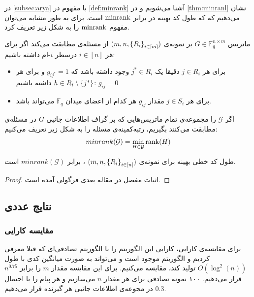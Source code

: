 در
\autoref{subsec:arya}
با مفهوم
در
\autoref{def:minrank}
آشنا می‌شویم و در
\autoref{thm:minranl}
نشان می‌دهیم که که طول کد بهینه در
\icod
برابر 
$\mathrm{minrank}$
است. برای
\picod
به طور مشابه می‌توان مفهوم
$\mathrm{minrank}$
را به شکل زیر تعریف کرد.
\begin{definition}
	ماتریس
	$G \in \mathbb{F}^{n\times m}_q$
	بر نمونه‌ی
		$(m, n, \left\{ R_i \right\}_{i \in [m]})$
		از مسئله‌ی
	\picod
	مطابقت می‌کند اگر برای هر
	$i \in [n]$
	درسطر 
	$i$-ام
	داشته باشیم:
	\begin{itemize}
		\item
		برای هر
		$j \in R_i$
		دقیقا یک
		$j^\ast \in R_i$
		وجود داشته باشد که 
		$g_{i j^\ast}= 1$
		و برای هر
		$h \in R_i \setminus \left\{ j^\ast \right\}$
		داشته باشیم:
		$g_{i j} = 0$ 
		\item
		برای هر
		$j \in S_i$
		مقدار
		$g_{i j}$
		هر کدام از اعضای میدان
		$\mathbb{F}_q$
		می‌تواند باشد.
	\end{itemize}
\end{definition}
\begin{definition}
	اگر
	$\mathcal{G}$
	را مجموعه‌ی تمام ماتریس‌هایی که بر گراف اطلاعات جانبی 	$G$ در مسئله‌ی
	\picod
	مطابقت می‌کنند بگیریم، رتبه‌کمینه‌ی مسئله را به شکل زیر تعریف می‌کنیم:
	$$minrank(\mathcal{G}) = \min_{H \in \mathcal{G}} \operatorname{rank}(H)$$
	
\end{definition}
\begin{theorem}
	\label{theorem:pliable2016:theorem3}
	طول کد خطی بهینه برای نمونه‌ی
	$(m, n, \left\{ R_i \right\}_{i \in [n]})$
	،
	\picod
	برابر
	$minrank(\mathcal{G})$
	است.
\end{theorem}
\begin{proof}
	اثبات مفصل در مقاله  بعدی فرگولی 
	\cite{song2016deterministic}
	آمده است.
\end{proof}

\subsection{
نتایج عددی
}
\subsubsection{
مقایسه کارایی
}
برای مقایسه‌ی کارایی، کارایی این الگوریتم را با الگوریتم تصادفی‌ای که قبلا معرفی کردیم و  الگوریتم موجود است و می‌تواند به صورت میانگین کدی با طول
$O(\log^2(n))$
تولید کند، مقایسه می‌کنیم. برای این مقایسه مقدار
$m$
را برابر
$n^{0.75}$
قرار می‌دهیم. ۱۰۰ نمونه تصادفی برای هر مقدار
$n$
می‌سازیم و هر پیام را با احتمال
$0.3$
در مجوعه‌ی اطلاعات جانبی هر گیرنده قرار می‌دهیم.

